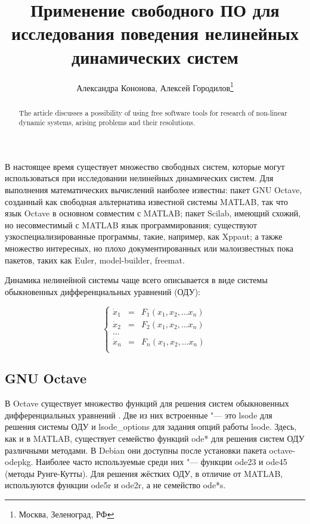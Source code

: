 \documentclass[10pt, a5paper]{article}
\begin{document}
\title{Применение свободного ПО для исследования поведения нелинейных динамических систем}%

\author{Александра Кононова, Алексей Городилов\footnote{Москва, Зеленоград, РФ}}
\maketitle

\begin{abstract}
The article discusses a possibility of using free software tools for research of non-linear dynamic systems, arising problems and their resolutions.
\end{abstract}

В настоящее время существует множество свободных систем, которые могут использоваться при исследовании нелинейных динамических систем. Для выполнения математических вычислений наиболее известны: пакет GNU Octave, созданный как свободная альтернатива известной системы MATLAB, так что язык Octave в основном совместим с MATLAB; пакет Scilab, имеющий схожий, но несовместимый с MATLAB язык программирования; существуют узкоспециализированные программы, такие, например, как Xppaut; а также множество интересных, но плохо документированных или малоизвестных пока пакетов, таких как Euler, model-builder, freemat.

Динамика нелинейной системы чаще всего описывается в виде системы обыкновенных дифференциальных уравнений (ОДУ):

$$
\left\{ 
\begin{array}{lll}
\dot x_1 &=& F_1(x_1, x_2,   \ldots  x_n )  \\
\dot x_2 &=& F_2(x_1, x_2,   \ldots  x_n )  \\
\ldots \\
\dot x_n &=& F_n(x_1, x_2,  \ldots  x_n )  \\
\end{array}
\right.
$$

\subsection*{GNU Octave}

В Octave существует множество функций для решения систем обыкновенных дифференциальных уравнений \cite{Kon1}. Две из них встроенные "--- это lsode для решения системы ОДУ и lsode\_options для задания опций работы lsode. Здесь, как и в MATLAB, существует семейство функций ode* для решения систем ОДУ различными методами. В Debian они доступны после установки пакета octave-odepkg. Наиболее часто используемые среди них "--- функции ode23 и ode45 (методы Рунге-Кутты). Для решения жёстких ОДУ, в отличие от MATLAB, используются функции ode5r и ode2r, а не семейство ode*s.
\end{document}

